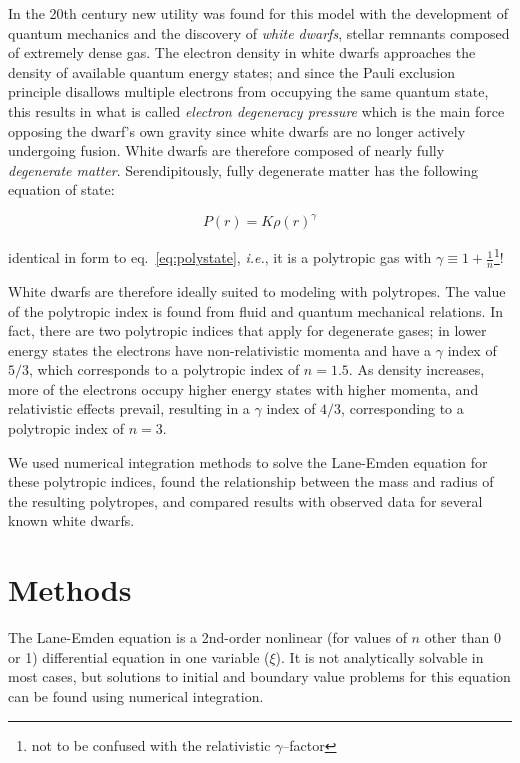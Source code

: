 \documentclass[twoside]{article}
\begin{document}
\begin{multicols}{2}
In the 20th century new utility was found for this model with the development of
quantum mechanics and the discovery of \emph{white dwarfs}, stellar remnants
composed of extremely dense gas. The electron density in white dwarfs approaches
the density of available quantum energy states; and since the Pauli exclusion
principle disallows multiple electrons from occupying the same quantum
state\cite[p.216]{griffithsqm}, this results in what is called \emph{electron
degeneracy pressure} which is the main force opposing the dwarf's own gravity
since white dwarfs are no longer actively undergoing
fusion.\cite[pp.163--166]{hansen2004} White dwarfs are therefore composed of
nearly fully \emph{degenerate matter}. Serendipitously, fully degenerate matter
has the following equation of state:

    \begin{equation}
        \label{eq:degenstate}
        P(r)=K\rho(r)^{\gamma}
    \end{equation}

identical in form to eq.~\ref{eq:polystate}, \emph{i.e.}, it is a polytropic gas
with \(\gamma\equiv 1+\frac{1}{n}\)\footnote{not to be confused with the
relativistic \(\gamma\)--factor}!

White dwarfs are therefore ideally suited to modeling with polytropes. The
value of the polytropic index is found from fluid and quantum mechanical
relations. In fact, there are two polytropic indices that apply for degenerate
gases; in lower energy states the electrons have non-relativistic momenta and
have a \(\gamma\) index of \(5/3\), which corresponds to a polytropic index of
\(n=1.5\). As density increases, more of the electrons occupy higher energy
states with higher momenta, and relativistic effects prevail, resulting in a
\(\gamma\) index of \(4/3\), corresponding to a polytropic index of \(n=3\). 


We used numerical integration methods to solve the Lane-Emden equation for these
polytropic indices, found the relationship between the mass and radius of the
resulting polytropes, and compared results with observed data for several known
white dwarfs.

\section{Methods}

The Lane-Emden equation is a 2nd-order nonlinear (for values of \(n\) other than
0 or 1) differential equation in one variable (\(\xi\)). It is not analytically
solvable in most cases, but solutions to initial and boundary value problems for
this equation can be found using numerical integration.


\end{multicols}
\end{document}
